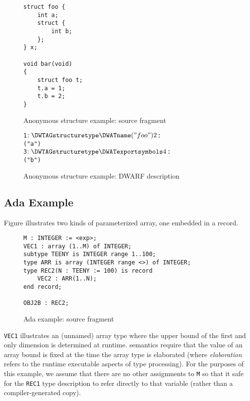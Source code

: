 \begin{figure}[ht]
\begin{lstlisting}
struct foo {
    int a;
    struct {
        int b;
    };
} x;

void bar(void)
{
    struct foo t;
    t.a = 1;
    t.b = 2;
}

\end{lstlisting}
\caption{Anonymous structure example: source fragment}
\label{fig:anonymousstructureexamplesourcefragment}
\end{figure}

\begin{figure}[ht]
\begin{dwflisting}
\begin{alltt}
1$:   \DWTAGstructuretype  
          \DWATname("foo")
2$:       \DWTAGmember
              \DWATname("a")
3$:       \DWTAGstructuretype
              \DWATexportsymbols
4$:           \DWTAGmember
                  \DWATname("b")
\end{alltt}
\end{dwflisting}
\caption{Anonymous structure example: DWARF description}
\label{fig:anonymousstructureexampledwarfdescription}
\end{figure}

\subsection{Ada Example}
\label{app:adaexample}
Figure 
illustrates two kinds of  
parameterized array, one embedded in a record.

\begin{figure}[ht]
\begin{lstlisting}
M : INTEGER := <exp>;
VEC1 : array (1..M) of INTEGER;
subtype TEENY is INTEGER range 1..100;
type ARR is array (INTEGER range <>) of INTEGER;
type REC2(N : TEENY := 100) is record
    VEC2 : ARR(1..N);
end record;

OBJ2B : REC2;
\end{lstlisting}
\caption{Ada example: source fragment}
\label{fig:adaexamplesourcefragment}
\end{figure}

\texttt{VEC1} illustrates an (unnamed) array type where the upper bound
of the first and only dimension is determined at runtime. 
semantics require that the value of an array bound is fixed at
the time the array type is elaborated (where \textit{elaboration} refers
to the runtime executable aspects of type processing). For
the purposes of this example, we assume that there are no
other assignments to \texttt{M} so that it safe for the \texttt{REC1} type
description to refer directly to that variable (rather than
a compiler-generated copy).

